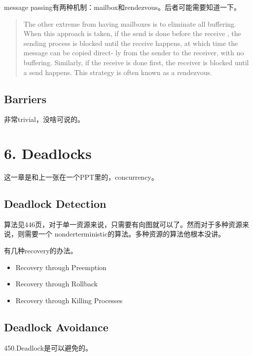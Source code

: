 \documentclass[a4paper]{article}
\begin{document}
message passing有两种机制：mailbox和rendezvous。后者可能需要知道一下。

\begin{quote}
      The other extreme from having mailboxes is to eliminate all buffering. When
this approach is taken, if the send is done before the receive , the sending process is
blocked until the receive happens, at which time the message can be copied direct-
ly from the sender to the receiver, with no buffering. Similarly, if the receive is
done first, the receiver is blocked until a send happens. This strategy is often
known as a rendezvous.
\end{quote}

\subsection{Barriers}
非常trivial，没啥可说的。

\section{6. Deadlocks}
这一章是和上一张在一个PPT里的，concurrency。

\subsection{Deadlock Detection}
算法见446页，对于单一资源来说，只需要有向图就可以了。然而对于多种资源来说，则需要一个
nonderterministic的算法。多种资源的算法他根本没讲。

有几种recovery的办法。
\begin{itemize}
\item{Recovery through Preemption} 
\item{Recovery through Rollback} 
\item{Recovery through Killing Processes} 
\end{itemize}

\subsection{Deadlock Avoidance}
450.Deadlock是可以避免的。
\end{document}
